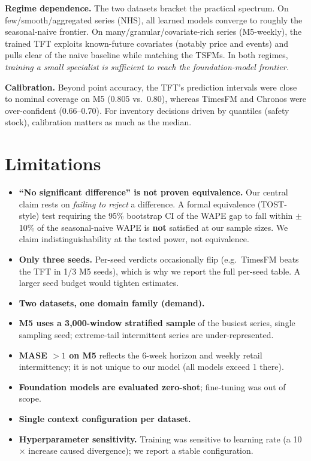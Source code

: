 \documentclass[11pt]{article}
\begin{document}
\textbf{Regime dependence.} The two datasets bracket the practical spectrum. On
few/smooth/aggregated series (NHS), all learned models converge to roughly the seasonal-naive
frontier. On many/granular/covariate-rich series (M5-weekly), the trained TFT exploits
known-future covariates (notably price and events) and pulls clear of the naive baseline while
matching the TSFMs. In both regimes, \emph{training a small specialist is sufficient to reach
the foundation-model frontier.}

\textbf{Calibration.} Beyond point accuracy, the TFT's prediction intervals were close to
nominal coverage on M5 (0.805 vs.\ 0.80), whereas TimesFM and Chronos were over-confident
(0.66--0.70). For inventory decisions driven by quantiles (safety stock), calibration matters
as much as the median.

\section{Limitations}
\begin{itemize}
\item \textbf{``No significant difference'' is not proven equivalence.} Our central claim rests
on \emph{failing to reject} a difference. A formal equivalence (TOST-style) test requiring the
95\% bootstrap CI of the WAPE gap to fall within $\pm$10\% of the seasonal-naive WAPE is
\textbf{not} satisfied at our sample sizes. We claim indistinguishability at the tested power,
not equivalence.
\item \textbf{Only three seeds.} Per-seed verdicts occasionally flip (e.g.\ TimesFM beats the
TFT in 1/3 M5 seeds), which is why we report the full per-seed table. A larger seed budget
would tighten estimates.
\item \textbf{Two datasets, one domain family (demand).}
\item \textbf{M5 uses a 3{,}000-window stratified sample} of the busiest series, single
sampling seed; extreme-tail intermittent series are under-represented.
\item \textbf{MASE $>1$ on M5} reflects the 6-week horizon and weekly retail intermittency; it
is not unique to our model (all models exceed 1 there).
\item \textbf{Foundation models are evaluated zero-shot}; fine-tuning was out of scope.
\item \textbf{Single context configuration per dataset.}
\item \textbf{Hyperparameter sensitivity.} Training was sensitive to learning rate
(a 10$\times$ increase caused divergence); we report a stable configuration.
\end{itemize}
\end{document}
